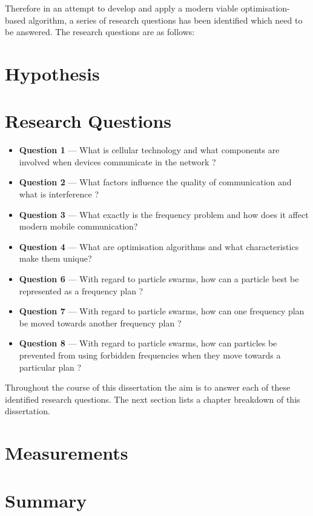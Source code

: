 Therefore in an attempt to develop and apply a modern viable optimisation-based algorithm, a series of research questions has been identified which need to be answered. The research questions are as follows:
\section{Hypothesis}
\section{Research Questions}
\begin{itemize}
\item \textbf{Question 1} --- What is cellular technology and what components are involved when devices communicate in the network ?
\item \textbf{Question 2} --- What factors influence the quality of communication and what is interference ?
\item \textbf{Question 3} --- What exactly is the frequency problem and how does it affect modern mobile communication?
\item \textbf{Question 4} --- What are optimisation algorithms and what characteristics make them unique?
\item \textbf{Question 6} --- With regard to particle swarms, how can a particle best be represented as a frequency plan ?
\item \textbf{Question 7} --- With regard to particle swarms, how can one frequency plan be moved towards another frequency plan ?
\item \textbf{Question 8} --- With regard to particle swarms, how can particles be prevented from using forbidden frequencies when they move towards a particular plan ?
\end{itemize}

Throughout the course of this dissertation the aim is to answer each of these identified research questions. The next section lists a chapter breakdown of this dissertation.

\section{Measurements}
\section{Summary}

